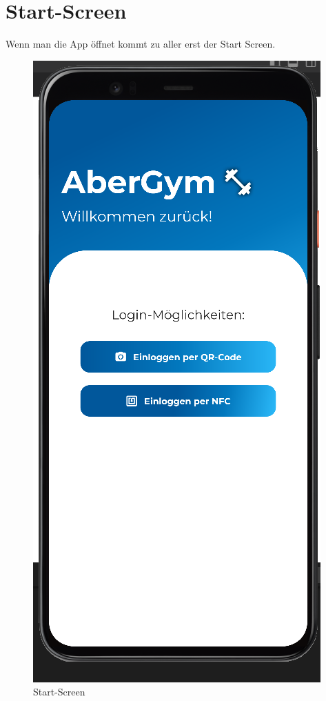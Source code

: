 \section{Start-Screen}

Wenn man die App öffnet kommt zu aller erst der Start Screen.

\begin{figure}[H]
        \centering
        \includegraphics[scale=0.3]{pics/Start-Screen.png}
        \caption{Start-Screen}
    \end{figure}

